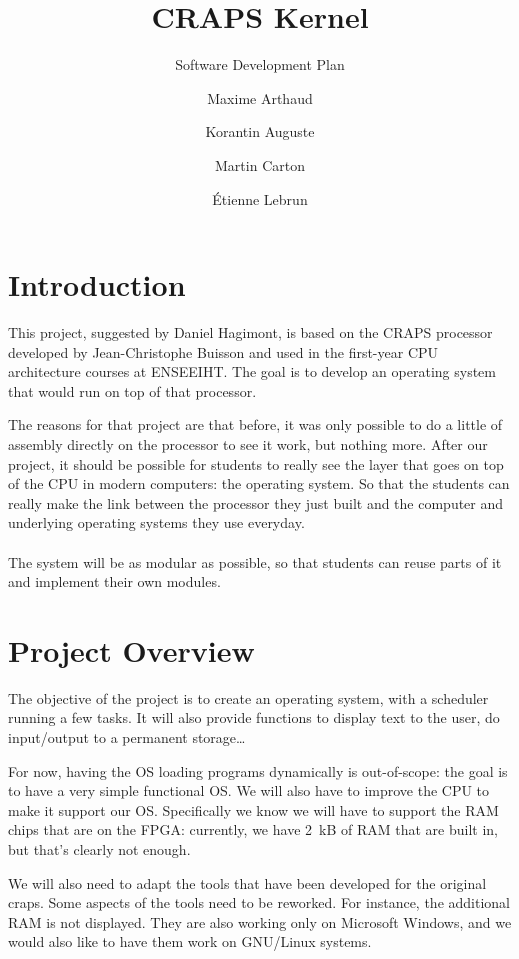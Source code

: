 \documentclass{article}
\title{CRAPS Kernel}
\subtitle{Software Development Plan}
\author{
       Maxime Arthaud
  \and Korantin Auguste
  \and Martin Carton
  \and Étienne Lebrun
}
\begin{document}
  
  \tableofcontents
  \newpage

  \section{Introduction}
    This project, suggested by Daniel Hagimont, is based on the CRAPS processor
    developed by Jean-Christophe Buisson and used in the first-year CPU
    architecture courses at ENSEEIHT. The goal is to develop an operating
    system that would run on top of that processor.

    The reasons for that project are that before, it was only possible to do a
    little of assembly directly on the processor to see it work, but nothing
    more.  After our project, it should be possible for students to really see
    the layer that goes on top of the CPU in modern computers: the operating
    system. So that the students can really make the link between the processor
    they just built and the computer and underlying operating systems they use
    everyday.

    \paragraph{}
    The system will be as modular as possible, so that students can reuse parts
    of it and implement their own modules.

  \section{Project Overview}
    The objective of the project is to create an operating system, with a
    scheduler running a few tasks. It will also provide functions to display
    text to the user, do input/output to a permanent storage\dots

    For now, having the OS loading programs dynamically is out-of-scope: the
    goal is to have a very simple functional OS.  We will also have to improve
    the CPU to make it support our OS. Specifically we know we will have to
    support the RAM chips that are on the FPGA: currently, we have \SI{2}{kB}
    of RAM that are built in, but that's clearly not enough.

    We will also need to adapt the tools that have been developed for the
    original craps. Some aspects of the tools need to be reworked. For
    instance, the additional RAM is not displayed. They are also working only on
    Microsoft Windows, and we would also like to have them work on GNU/Linux
    systems.
\end{document}
